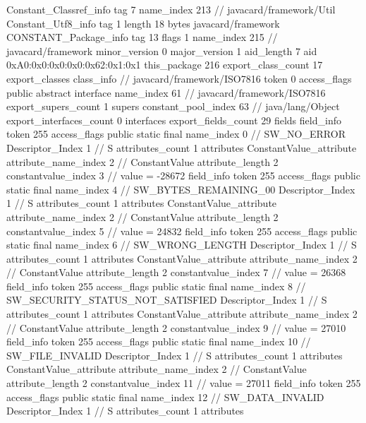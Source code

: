{{{		}
		Constant_Classref_info {
			tag	7
			name_index	213		// javacard/framework/Util
		}
		Constant_Utf8_info {
			tag	1
			length	18
			bytes	javacard/framework
		}
		CONSTANT_Package_info {
			tag	13
			flags	1
			name_index	215		// javacard/framework
			minor_version	0
			major_version	1
			aid_length	7
			aid	0xA0:0x0:0x0:0x0:0x62:0x1:0x1
		}
	}
	this_package	216
	export_class_count	17
	export_classes {
		class_info {		// javacard/framework/ISO7816
			token	0
			access_flags	public abstract interface
			name_index	61		// javacard/framework/ISO7816
			export_supers_count	1
			supers {
				constant_pool_index	63		// java/lang/Object
			}
			export_interfaces_count	0
			interfaces {
			}
			export_fields_count	29
			fields {
			field_info {
				token	255
				access_flags	public static final
				name_index	0		// SW_NO_ERROR
				Descriptor_Index	1		// S
				attributes_count	1
				attributes {
				ConstantValue_attribute {
					attribute_name_index	2		// ConstantValue
					attribute_length	2
					constantvalue_index	3		// value = -28672
				}
				}
			}
			field_info {
				token	255
				access_flags	public static final
				name_index	4		// SW_BYTES_REMAINING_00
				Descriptor_Index	1		// S
				attributes_count	1
				attributes {
				ConstantValue_attribute {
					attribute_name_index	2		// ConstantValue
					attribute_length	2
					constantvalue_index	5		// value = 24832
				}
				}
			}
			field_info {
				token	255
				access_flags	public static final
				name_index	6		// SW_WRONG_LENGTH
				Descriptor_Index	1		// S
				attributes_count	1
				attributes {
				ConstantValue_attribute {
					attribute_name_index	2		// ConstantValue
					attribute_length	2
					constantvalue_index	7		// value = 26368
				}
				}
			}
			field_info {
				token	255
				access_flags	public static final
				name_index	8		// SW_SECURITY_STATUS_NOT_SATISFIED
				Descriptor_Index	1		// S
				attributes_count	1
				attributes {
				ConstantValue_attribute {
					attribute_name_index	2		// ConstantValue
					attribute_length	2
					constantvalue_index	9		// value = 27010
				}
				}
			}
			field_info {
				token	255
				access_flags	public static final
				name_index	10		// SW_FILE_INVALID
				Descriptor_Index	1		// S
				attributes_count	1
				attributes {
				ConstantValue_attribute {
					attribute_name_index	2		// ConstantValue
					attribute_length	2
					constantvalue_index	11		// value = 27011
				}
				}
			}
			field_info {
				token	255
				access_flags	public static final
				name_index	12		// SW_DATA_INVALID
				Descriptor_Index	1		// S
				attributes_count	1
				attributes {
}}}}}}
